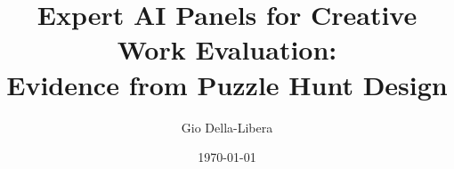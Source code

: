 \documentclass{article}
\title{Expert AI Panels for Creative Work Evaluation:\\
Evidence from Puzzle Hunt Design}
\author{Gio Della-Libera}
\date{\today}
\begin{document}
\maketitle

\begin{abstract}

\end{abstract}










\end{document}
